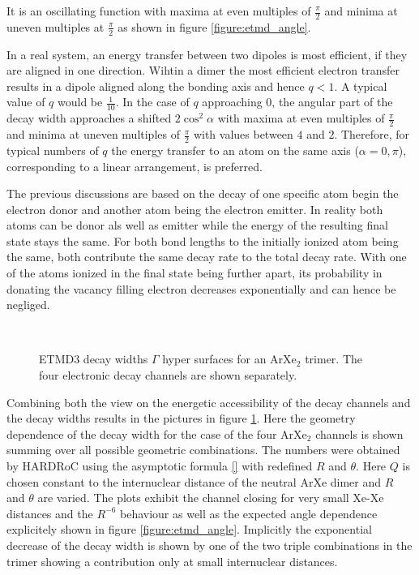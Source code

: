 It is an oscillating function with maxima at even multiples of $\frac \pi 2$
and minima at uneven multiples at $\frac \pi 2$ as shown in figure
\ref{figure:etmd_angle}.


In a real system, an energy transfer between
two dipoles is most efficient, if they are aligned in one direction.
Wihtin a dimer the most efficient electron transfer results in a
dipole aligned along the bonding axis and hence $q<1$. A typical
value of $q$ would be $\frac 1{10}$. In the 
case of $q$ approaching 0, the angular part of
the decay width
approaches a shifted $2\cos^2 \alpha$ with maxima at even multiples of $\frac \pi2$
and minima at uneven multiples of $\frac \pi2$ with values between
$4$ and $2$.
Therefore, for typical numbers of $q$ the energy transfer
to an atom on the same axis ($\alpha = 0,\pi$), corresponding
to a linear arrangement, is preferred.

The previous discussions are based on the decay of one specific atom
begin the electron donor and another atom being the electron emitter.
In reality both atoms can be donor als well as emitter while the energy
of the resulting final state stays the same. For both bond lengths to the
initially ionized atom being the same, both contribute the same decay rate
to the total decay rate. With one of the atoms ionized in the final state
being further apart, its probability in donating the vacancy filling electron
decreases exponentially and can hence be negliged.

\begin{figure}[ht]
 \centering
 
 \\
 
 
 \caption{\ac{ETMD}3 decay widths $\Gamma$ hyper surfaces for an ArXe$_2$ trimer.
          The four electronic decay channels are shown separately.}
 \label{figure:ArXe2_etmd_geom_gamma}
\end{figure}


Combining both the view on the energetic accessibility of the decay
channels and the decay widths results in the pictures in
figure \ref{figure:ArXe2_etmd_geom_gamma}.
Here the geometry dependence of the decay width for the case of the four ArXe$_2$
channels is shown summing over all possible geometric combinations.
The numbers were obtained by \ac{HARDRoC} using the
asymptotic formula \ref{} with redefined $R$ and $\theta$. Here $Q$ is chosen constant
to the internuclear distance of the neutral ArXe dimer and $R$ and $\theta$
are varied. The plots exhibit the channel closing for very small Xe-Xe distances
and the $R^{-6}$ behaviour as well as the expected angle dependence explicitely
shown in figure \ref{figure:etmd_angle}. Implicitly the exponential decrease
of the decay width is shown by one of the two triple combinations in the trimer
showing a contribution only at small internuclear distances.

